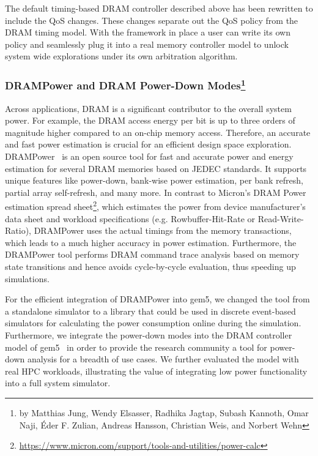 The default timing-based DRAM controller described above has been rewritten to include the QoS changes.
These changes separate out the QoS policy from the DRAM timing model.
With the framework in place a user can write its own policy and seamlessly plug it into a real memory controller model to unlock system wide explorations under its own arbitration algorithm.

\subsubsection[DRAMPower and DRAM Power-Down Modes]{DRAMPower and DRAM Power-Down Modes\footnote{by Matthias Jung, Wendy Elsasser, Radhika Jagtap, Subash Kannoth, Omar Naji, Éder F.
Zulian, Andreas Hansson, Christian Weis, and Norbert Wehn }}
%
Across applications, DRAM is a significant contributor to the overall system power.
For example, the DRAM access energy per bit is up to three orders of magnitude higher compared to an on-chip memory access.
Therefore, an accurate and fast power estimation is crucial for an efficient design space exploration.
DRAMPower~\cite{kargoo_14} is an open source tool for fast and accurate power and energy estimation for several DRAM memories based on JEDEC standards.
It supports unique features like power-down, bank-wise power estimation, per bank refresh, partial array self-refresh, and many more.
In contrast to Micron’s DRAM Power estimation spread sheet\footnote{\url{https://www.micron.com/support/tools-and-utilities/power-calc}}, which estimates the power from device manufacturer’s data sheet and workload specifications (e.g. Rowbuffer-Hit-Rate or Read-Write-Ratio), DRAMPower uses the actual timings from the memory transactions, which leads to a much higher accuracy in power estimation.
Furthermore, the DRAMPower tool performs DRAM command trace analysis based on memory state transitions and hence avoids cycle-by-cycle evaluation, thus speeding up simulations.

For the efficient integration of DRAMPower into gem5, we changed the tool from a standalone simulator to a library that could be used in discrete event-based simulators for calculating the power consumption online during the simulation.
Furthermore, we integrate the power-down modes into the DRAM controller model of gem5~\cite{jagjun_17} in order to provide the research community a tool for power-down analysis for a breadth of use cases. We further evaluated the model with real HPC workloads, illustrating the value of integrating low power functionality into a full system simulator.
%
